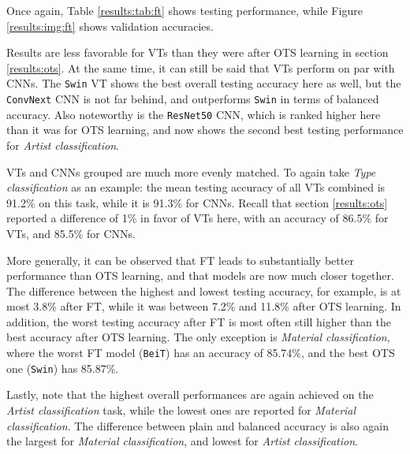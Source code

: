 Once again, Table \ref{results:tab:ft} shows testing performance, while Figure \ref{results:img:ft} shows validation accuracies.

Results are less favorable for VTs than they were after OTS learning in section \ref{results:ots}. At the same time, it can still be said that VTs perform on par with CNNs. The \texttt{Swin} VT shows the best overall testing accuracy here as well, but the \texttt{ConvNext} CNN is not far behind, and outperforms \texttt{Swin} in terms of balanced accuracy. Also noteworthy is the \texttt{ResNet50} CNN, which is ranked higher here than it was for OTS learning, and now shows the second best testing performance for \textit{Artist classification}.

VTs and CNNs grouped are much more evenly matched. To again take \textit{Type classification} as an example: the mean testing accuracy of all VTs combined is 91.2\% on this task, while it is 91.3\% for CNNs. Recall that section \ref{results:ots} reported a difference of 1\% in favor of VTs here, with an accuracy of 86.5\% for VTs, and 85.5\% for CNNs.

More generally, it can be observed that FT leads to substantially better performance than OTS learning, and that models are now much closer together. The difference between the highest and lowest testing accuracy, for example, is at most 3.8\% after FT, while it was between 7.2\% and 11.8\% after OTS learning. In addition, the worst testing accuracy after FT is most often still higher than the best accuracy after OTS learning. The only exception is \textit{Material classification}, where the worst FT model (\texttt{BeiT}) has an accuracy of 85.74\%, and the best OTS one (\texttt{Swin}) has 85.87\%.

Lastly, note that the highest overall performances are again achieved on the \textit{Artist classification} task, while the lowest ones are reported for \textit{Material classification}. The difference between plain and balanced accuracy is also again the largest for \textit{Material classification}, and lowest for \textit{Artist classification}.




